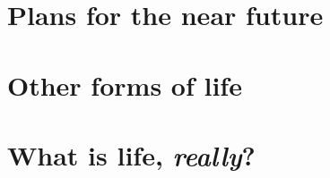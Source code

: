 \documentclass[DIV=calc, paper=a4, fontsize=12pt]{scrartcl}	 %
\begin{document}
{\begin{multicols}{2}










\end{multicols}




\section{Plans for the near future}

\begin{multicols}{2}






\end{multicols}

\section{Other forms of life}

\begin{multicols}{2}



\end{multicols}


\section*{What is life, \textit{really}?}

}
\end{document}
